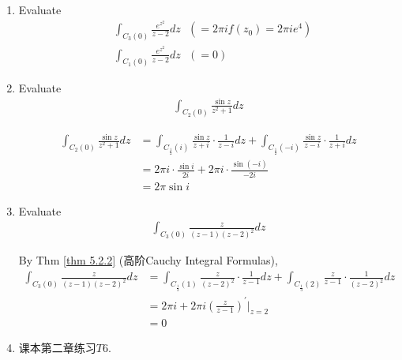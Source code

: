 \begin{enumerate}
		\item Evaluate
		\begin{align}
			&\int_{C_{3}(0)}{\frac{e^{z^2}}{z - 2} dz} \,\,\,\, ( = 2 \pi i f(z_0) = 2 \pi i e^4) \\
			&\int_{C_{1}(0)}{\frac{e^{z^2}}{z - 2} dz} \,\,\,\, ( = 0)
		\end{align}
	
		\vspace{2em}
		
		\item Evaluate
		\begin{align}
			\int_{C_{2}(0)}{\frac{\sin{z}}{z^2 + 1} dz}
		\end{align}
		
		\vspace{2em}
		\begin{solution}
			\begin{align}
				\int_{C_{2}(0)}{\frac{\sin{z}}{z^2 + 1} dz} 
				&= \int_{C_{\frac{1}{2}}(i)}{\frac{\sin{z}}{z + i} \cdot \frac{1}{z - i} dz} + \int_{C_{\frac{1}{2}}(-i)}{\frac{\sin{z}}{z - i} \cdot \frac{1}{z + i} dz} \\
				&= 2 \pi i \cdot \frac{\sin{i}}{2i} + 2 \pi i \cdot \frac{\sin{(-i)}}{-2i} \\
				&= 2\pi \sin{i}
			\end{align}
		\end{solution}
	
		\vspace{2em}
		
		\item Evaluate
		\begin{align}
			\int_{C_{3}(0)}{\frac{z}{(z - 1)(z - 2)^2} dz}
		\end{align}
	
		\vspace{2em}
		\begin{solution}
			By Thm \ref{thm 5.2.2} (高阶Cauchy Integral Formulas),
			\begin{align}
				\int_{C_{3}(0)}{\frac{z}{(z - 1)(z - 2)^2} dz} 
				&= \int_{C_{\frac{1}{3}}(1)}{\frac{z}{(z - 2)^2} \cdot \frac{1}{z - 1} dz} + \int_{C_{\frac{1}{3}}(2)}{\frac{z}{z - 1} \cdot \frac{1}{(z - 2)^2} dz} \\
				&= 2 \pi i + 2 \pi i \left( \frac{z}{z - 1} \right)^{'}\Big|_{z = 2} \\
				&= 0
			\end{align}
		\end{solution}
	
		\vspace{1em}
		
		\item 课本第二章练习$T6$.
	\end{enumerate}













	\ifx\allfiles\undefined

\fi
